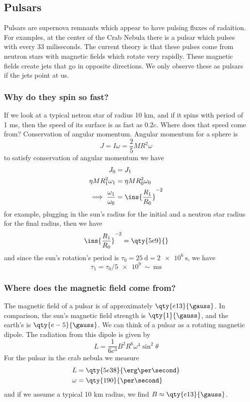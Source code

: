 \subsection{Pulsars}
Pulsars are supernova remnants which appear to have pulsing fluxes of radaition.
For examples, at the center of the Crab Nebula there is a pulsar which pulses with every 33 miliseconds. The current theory is that these pulses come from neutron stars with magnetic fields which rotate very rapidly. These magnetic fields create jets that go in opposite directions.
We only observe these as pulsars if the jets point at us. 
\subsubsection{Why do they spin so fast?}
If we look at a typical netron star of radius 10 km, and if it spins with period of 1 ms, then the speed of its surface is as fast as \(0.2c\). Where does that speed come from? Conservation of angular momentum. Angular momentum for a sphere is
\begin{equation}
    J = I\omega = \frac{2}{5}MR^2\omega
\end{equation}
to satisfy conservation of angular momentum we have
\begin{align}
    J_0&=J_1 \\
    \eta MR_1^2\omega_1 &= \eta MR_0^2\omega_0 \\
    \implies\frac{\omega_1}{\omega_0} &= \ins{\frac{R_1}{R_0}}^{-2}
\end{align}
for example, plugging in the sun's radius for the initial and a neutron star radius for the final radius, then we have
\begin{equation}
    \ins{\frac{R_1}{R_0}}^{-2} = \qty{5e9}{}
\end{equation}
and since the sun's rotation's period is \(\tau_0 = \qty{25}{\day}=\qty{2e6}{\second}\), we have
\begin{equation}
    \tau_1 = \tau_0/\qty{5e9}{} \sim \qty{}{\milli\second}
\end{equation}
\subsubsection{Where does the magnetic field come from?}
The magnetic field of a pulsar is of approximately \(\qty{e13}{\gauss}\). In comparison, the sun's magnetic field strength is \(\qty{1}{\gauss}\), and the earth's is \(\qty{e-5}{\gauss}\). We can think of a pulsar as a rotating magnetic dipole.
The radiation from this dipole is given by
\begin{equation}
    L = \frac{1}{6c^3}B^2R^6\omega^4\sin^2\theta
\end{equation}
For the pulsar in the crab nebula we measure
\begin{align}
    L &= \qty{5e38}{\erg\per\second} \\
    \omega &= \qty{190}{\per\second}
\end{align}
and if we assume a typical 10 km radius, we find \(B\approx\qty{e13}{\gauss}\).
